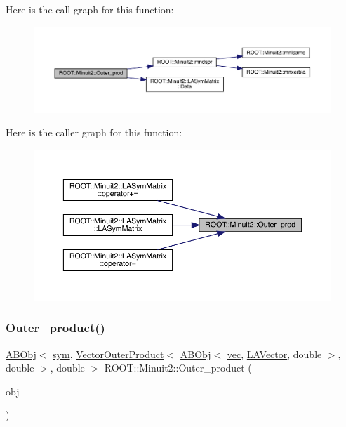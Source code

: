 Here is the call graph for this function\+:\nopagebreak
\begin{figure}[H]
\begin{center}
\leavevmode
\includegraphics[width=350pt]{d6/d3a/namespaceROOT_1_1Minuit2_ac07a37ec0cf04b47c95ddc6943487ef2_cgraph}
\end{center}
\end{figure}
Here is the caller graph for this function\+:\nopagebreak
\begin{figure}[H]
\begin{center}
\leavevmode
\includegraphics[width=350pt]{d6/d3a/namespaceROOT_1_1Minuit2_ac07a37ec0cf04b47c95ddc6943487ef2_icgraph}
\end{center}
\end{figure}
\mbox{\label{namespaceROOT_1_1Minuit2_a2f3a76ab9b1a9a2ed58cfdc8de6ff704}} 
\subsubsection{\texorpdfstring{Outer\_product()}{Outer\_product()}\hspace{0.1cm}{\footnotesize\ttfamily [1/2]}}
{\footnotesize\ttfamily \mbox{\hyperlink{classROOT_1_1Minuit2_1_1ABObj}{A\+B\+Obj}}$<$ \mbox{\hyperlink{classROOT_1_1Minuit2_1_1sym}{sym}}, \mbox{\hyperlink{classROOT_1_1Minuit2_1_1VectorOuterProduct}{Vector\+Outer\+Product}}$<$ \mbox{\hyperlink{classROOT_1_1Minuit2_1_1ABObj}{A\+B\+Obj}}$<$ \mbox{\hyperlink{classROOT_1_1Minuit2_1_1vec}{vec}}, \mbox{\hyperlink{classROOT_1_1Minuit2_1_1LAVector}{L\+A\+Vector}}, double $>$, double $>$, double $>$ R\+O\+O\+T\+::\+Minuit2\+::\+Outer\+\_\+product (\begin{DoxyParamCaption}\item[{const \mbox{\hyperlink{classROOT_1_1Minuit2_1_1ABObj}{A\+B\+Obj}}$<$ \mbox{\hyperlink{classROOT_1_1Minuit2_1_1vec}{vec}}, \mbox{\hyperlink{classROOT_1_1Minuit2_1_1LAVector}{L\+A\+Vector}}, double $>$ \&}]{obj }\end{DoxyParamCaption})\hspace{0.3cm}{\ttfamily [inline]}}

